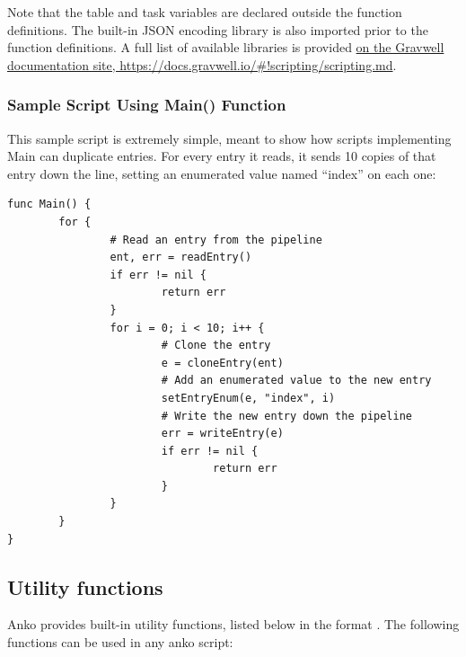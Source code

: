 Note that the table and task variables are declared outside the
function definitions. The built-in JSON encoding library is also
imported prior to the function definitions. A full list of available
libraries is provided \href{https://docs.gravwell.io/#!scripting/scripting.md}{on the Gravwell documentation site, https://docs.gravwell.io/\#!scripting/scripting.md}.

\subsubsection{Sample Script Using Main() Function}

This sample script is extremely simple, meant to show how scripts
implementing Main can duplicate entries. For every entry it reads, it
sends 10 copies of that entry down the line, setting an enumerated value
named ``index'' on each one:

\begin{Verbatim}[breaklines=true]
func Main() {
        for {
                # Read an entry from the pipeline
                ent, err = readEntry()
                if err != nil {
                        return err
                }
                for i = 0; i < 10; i++ {
                        # Clone the entry
                        e = cloneEntry(ent)
                        # Add an enumerated value to the new entry
                        setEntryEnum(e, "index", i)
                        # Write the new entry down the pipeline
                        err = writeEntry(e)
                        if err != nil {
                                return err
                        }
                }
        }
}
\end{Verbatim}


\subsection{Utility functions}

Anko provides built-in utility functions, listed below in the format
. The following functions can be
used in any anko script:

